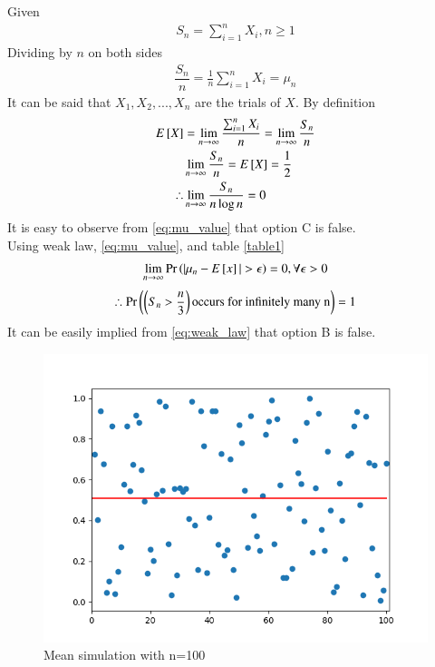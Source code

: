 \documentclass[journal,12pt,twocolumn]{IEEEtran}
\begin{document}
Given
\begin{align}
\displaystyle S_n=\sum_{i=1}^{n}X_i , n\ge 1
\end{align}
Dividing by $n$ on both sides
\begin{align}
\dfrac{S_n}{n}=\displaystyle\frac{1}{n} \sum_{i=1}^{n}X_i=\mu_n
\end{align}
It can be said that $X_1,X_2,...,X_n$ are the trials of $X$. By definition
\begin{align}
E{}\left[X\right]&=\displaystyle \lim_{n\to \infty} \frac{\sum_{i=1}^{n}X_i}{n}=\lim_{n\to \infty} \frac{S_n}{n}\\
&\lim_{n\to \infty} \frac{S_n}{n}=E{}\left[X\right]=\frac{1}{2} \label{eq:mu_value} \\
\therefore&\lim_{n\to \infty} \frac{S_n}{n\log{n}}=0
\end{align}
It is easy to observe from \eqref{eq:mu_value} that option C is false.\\
Using weak law, \eqref{eq:mu_value}, and table \eqref{table1}
\begin{align}
\lim_{n\to\infty} \Pr\left(\vert\mu_n-E{}\left[x\right]\vert>\epsilon\right)=0, \forall \epsilon >0 \label{eq:weak_law}
\end{align}
\begin{align}
\therefore \Pr\left(\left(S_n>\frac{n}{3}\right)\text{occurs for infinitely many n}\right)=1
\end{align}
It can be easily implied from \eqref{eq:weak_law} that option B is false.

\begin{figure}[ht]
\centering
\includegraphics[width=\linewidth]{figure/fig}
\caption{Mean simulation with n=100}
\label{plot}
\end{figure}
\end{document}
